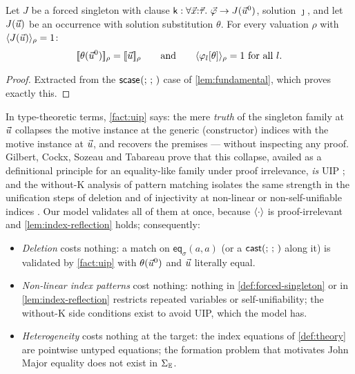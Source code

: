 \begin{fact}
\label{fact:uip}
Let $J$ be a forced singleton with clause $\mathsf{k} : \forall
\vec{x}{:}\vec{\tau}.\ \vec{\varphi} \to J(\vec{u}^0)$, solution
$\jmath$, and let $J(\vec{u})$ be an occurrence with solution
substitution $\theta$.  For every valuation $\rho$ with
$\langle J(\vec{u}) \rangle_{\rho} = 1$:
\[
  [\![ \theta(\vec{u}^0) ]\!]_\rho = [\![ \vec{u} ]\!]_\rho
  \qquad\text{and}\qquad
  \langle \varphi_l[\theta] \rangle_{\rho} = 1 \ \text{for all } l.
\]
\end{fact}

\begin{proof}
Extracted from the $\mathsf{scase}_{}(;\,;\,)$ case of \cref{lem:fundamental},
which proves exactly this.
\end{proof}

In type-theoretic terms, \cref{fact:uip} says: the mere \emph{truth} of
the singleton family at $\vec{u}$ collapses the motive instance at the
generic (constructor) indices with the motive instance at $\vec{u}$, and
recovers the premises --- without inspecting any proof.  Gilbert,
Cockx, Sozeau and Tabareau prove that this collapse, availed as a
definitional principle for an equality-like family under proof
irrelevance, \emph{is} UIP \cite[\S 2.2]{GilbertEtAl2019}; and the
without-K analysis of pattern matching isolates the same strength in the
unification steps of deletion and of injectivity at non-linear or
non-self-unifiable indices \cite{CockxEtAl2014,CockxDevriese2018}.  Our
model validates all of them at once, because $\langle \cdot \rangle$ is
proof-irrelevant and \cref{lem:index-reflection} holds; consequently:

\begin{itemize}[leftmargin=2em]
\item \emph{Deletion} costs nothing: a match on $\mathsf{eq}_\sigma(a,a)$
  (or a $\mathsf{cast}(;\,;\,)$ along it) is validated by \cref{fact:uip} with
  $\theta(\vec{u}^0)$ and $\vec{u}$ literally equal.
\item \emph{Non-linear index patterns} cost nothing: nothing in
  \cref{def:forced-singleton} or in \cref{lem:index-reflection}
  restricts repeated variables or self-unifiability; the without-K
  side conditions exist to avoid UIP, which the model has.
\item \emph{Heterogeneity} costs nothing at the target: the index
  equations of \cref{def:theory} are pointwise untyped equations; the
  formation problem that motivates John Major equality
  \cite{McBride1999} does not exist in $\Sigma_{\mathbb{E}}$.
\end{itemize}

